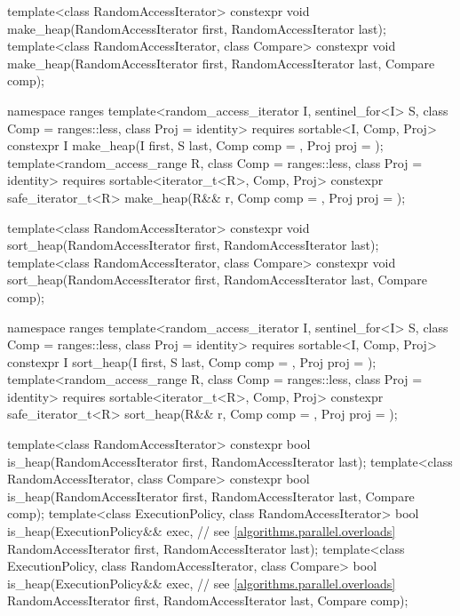 \begin{codeblock}
{  template<class RandomAccessIterator>
    constexpr void make_heap(RandomAccessIterator first, RandomAccessIterator last);
  template<class RandomAccessIterator, class Compare>
    constexpr void make_heap(RandomAccessIterator first, RandomAccessIterator last,
                             Compare comp);

  namespace ranges {
    template<random_access_iterator I, sentinel_for<I> S, class Comp = ranges::less,
             class Proj = identity>
      requires sortable<I, Comp, Proj>
      constexpr I
        make_heap(I first, S last, Comp comp = {}, Proj proj = {});
    template<random_access_range R, class Comp = ranges::less, class Proj = identity>
      requires sortable<iterator_t<R>, Comp, Proj>
      constexpr safe_iterator_t<R>
        make_heap(R&& r, Comp comp = {}, Proj proj = {});
  }

  template<class RandomAccessIterator>
    constexpr void sort_heap(RandomAccessIterator first, RandomAccessIterator last);
  template<class RandomAccessIterator, class Compare>
    constexpr void sort_heap(RandomAccessIterator first, RandomAccessIterator last,
                             Compare comp);

  namespace ranges {
    template<random_access_iterator I, sentinel_for<I> S, class Comp = ranges::less,
             class Proj = identity>
      requires sortable<I, Comp, Proj>
      constexpr I
        sort_heap(I first, S last, Comp comp = {}, Proj proj = {});
    template<random_access_range R, class Comp = ranges::less, class Proj = identity>
      requires sortable<iterator_t<R>, Comp, Proj>
      constexpr safe_iterator_t<R>
        sort_heap(R&& r, Comp comp = {}, Proj proj = {});
  }

  template<class RandomAccessIterator>
    constexpr bool is_heap(RandomAccessIterator first, RandomAccessIterator last);
  template<class RandomAccessIterator, class Compare>
    constexpr bool is_heap(RandomAccessIterator first, RandomAccessIterator last,
                           Compare comp);
  template<class ExecutionPolicy, class RandomAccessIterator>
    bool is_heap(ExecutionPolicy&& exec,                        // see \ref{algorithms.parallel.overloads}
                 RandomAccessIterator first, RandomAccessIterator last);
  template<class ExecutionPolicy, class RandomAccessIterator, class Compare>
    bool is_heap(ExecutionPolicy&& exec,                        // see \ref{algorithms.parallel.overloads}
                 RandomAccessIterator first, RandomAccessIterator last,
                 Compare comp);

}
\end{codeblock}
